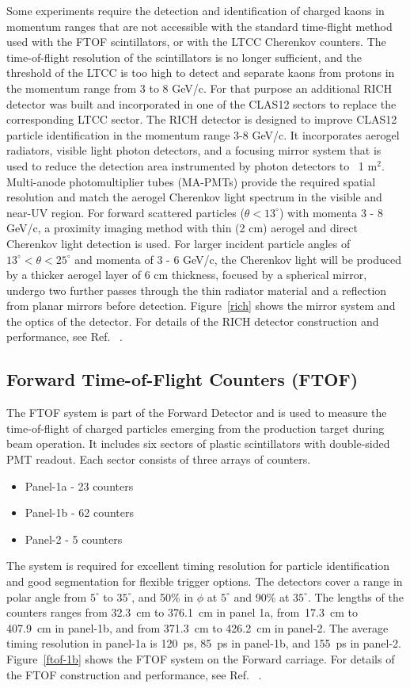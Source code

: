 \documentclass[final,3p,twocolumn]{elsarticle}
\begin{document}
Some experiments require the detection and identification of charged kaons in momentum ranges that are not 
accessible with the standard time-flight method used with the FTOF scintillators, or with the LTCC Cherenkov counters.
The time-of-flight resolution of the scintillators is no longer sufficient, and the threshold of the LTCC is too high 
to detect and separate kaons from protons in the momentum range from 3 to 8 GeV/c. For that purpose an additional
RICH detector was built and incorporated in one of the CLAS12 sectors to replace the corresponding LTCC sector. 
The RICH detector is designed to improve CLAS12 particle identification in the momentum range 3-8 GeV/c. It incorporates 
aerogel radiators, visible light photon detectors, and a focusing mirror system that is used to reduce the detection 
area instrumented by photon detectors to ~1 m$^2$.  Multi-anode photomultiplier tubes (MA-PMTs) provide the required 
spatial resolution and match the aerogel Cherenkov light spectrum in the visible and near-UV region.
For forward scattered particles ($\theta < 13^\circ$) with momenta 3 - 8 GeV/c, a proximity imaging method with thin (2 cm) 
aerogel and direct Cherenkov light detection is used. For larger incident particle angles of $13^\circ < \theta < 25^\circ$ and 
momenta of 3 - 6 GeV/c, the Cherenkov light will be produced by a thicker aerogel layer of 6 cm thickness, focused by a 
spherical mirror, undergo two further passes through the thin radiator material and a reflection from planar mirrors before 
detection. Figure~\ref{rich} shows the mirror system and the optics of the detector. For details of the RICH detector construction and performance, see Ref. ~\cite{RICH}.

\subsection{\rm Forward Time-of-Flight Counters (FTOF)}
\label{ftof}

The FTOF system is part of the Forward Detector and is used to measure the time-of-flight of charged particles 
emerging from the production target during beam operation. It includes six sectors of plastic scintillators with 
double-sided PMT readout. Each sector consists of three arrays of counters. 
\begin{itemize}
\item Panel-1a - 23 counters 
\item Panel-1b - 62 counters
\item Panel-2 - 5 counters 
\end{itemize}
The system is required for excellent timing resolution for particle identification and good segmentation for 
flexible trigger options. The detectors cover a  range in polar angle from $5^\circ$ to $35^\circ$, and 50\% in $\phi$ at 
$5^\circ$ and 90\% at $35^\circ$. The lengths of the counters ranges from 32.3~cm to 376.1~cm in panel 1a, from~17.3~cm 
to 407.9~cm in panel-1b, and from 371.3~cm to 426.2~cm in panel-2.  The average timing resolution in panel-1a is 120~ps, 
85~ps in panel-1b, and 155~ps in panel-2.  
Figure~\ref{ftof-1b} shows the FTOF system on the Forward carriage.
For details of the FTOF construction and performance, see Ref. ~\cite{FTOF}. 
\end{document}
